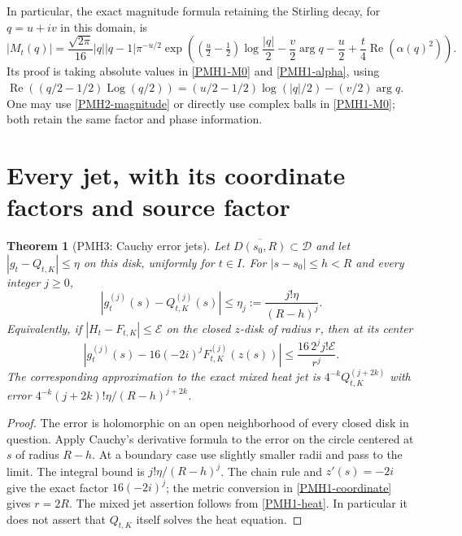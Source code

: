 \documentclass[11pt]{article}
\newtheorem{theorem}{Theorem}
\newcommand{\Log}{\operatorname{Log}}
\newcommand{\Rea}{\operatorname{Re}}
\begin{document}
In particular, the exact magnitude formula retaining the Stirling
decay, for $q=u+iv$ in this domain, is
\begin{equation}\label{PMH2-magnitude}
 |M_t(q)|=\frac{\sqrt{2\pi}}{16}|q||q-1|\pi^{-u/2}
 \exp\left((\tfrac u2-\tfrac12)\log\frac{|q|}{2}
 -\frac v2\arg q-\frac u2+\frac t4\Rea(\alpha(q)^2)\right).
\end{equation}
Its proof is taking absolute values in \eqref{PMH1-M0} and
\eqref{PMH1-alpha}, using
$\Rea((q/2-1/2)\Log(q/2))=(u/2-1/2)\log(|q|/2)-(v/2)\arg q$.
One may use \eqref{PMH2-magnitude} or directly use complex balls in
\eqref{PMH1-M0}; both retain the same factor and phase information.

\section{Every jet, with its coordinate factors and source factor}

\begin{theorem}[PMH3: Cauchy error jets]
\label{PMH3}
Let $\overline{D(s_0,R)}\subset\mathcal D$ and let
$|g_t-Q_{t,K}|\le\eta$ on this disk, uniformly for $t\in I$.
For $|s-s_0|\le h<R$ and every integer $j\ge0$,
\begin{equation}\label{PMH3-sjet}
 |g_t^{(j)}(s)-Q_{t,K}^{(j)}(s)|
 \le\eta_j:=\frac{j!\eta}{(R-h)^j}.
\end{equation}
Equivalently, if $|H_t-F_{t,K}|\le\mathcal E$ on the closed
$z$-disk of radius $r$, then at its center
\begin{equation}\label{PMH3-zjet}
 \left|g_t^{(j)}(s)-16(-2i)^jF_{t,K}^{(j)}(z(s))\right|
 \le\frac{16\,2^j j!\mathcal E}{r^j}.
\end{equation}
The corresponding approximation to the exact mixed heat jet is
$4^{-k}Q_{t,K}^{(j+2k)}$ with error
$4^{-k}(j+2k)!\eta/(R-h)^{j+2k}$.
\end{theorem}
\begin{proof}
The error is holomorphic on an open neighborhood of every closed
disk in question. Apply Cauchy's derivative formula to the error on
the circle centered at $s$ of radius $R-h$. At a boundary case use
slightly smaller radii and pass to the limit. The integral bound is
$j!\eta/(R-h)^j$. The chain rule and
$z'(s)=-2i$ give the exact factor $16(-2i)^j$;
the metric conversion in \eqref{PMH1-coordinate} gives $r=2R$.
The mixed jet assertion follows from \eqref{PMH1-heat}.
In particular it does not assert that $Q_{t,K}$ itself solves the
heat equation.
\end{proof}
\end{document}
